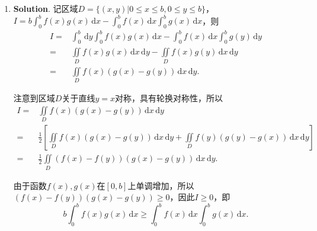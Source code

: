 \documentclass[../Main.tex]{subfiles}
\begin{document}
\begin{enumerate}
    \item[15.] \textbf{Solution}. 记区域$D=\{(x,y)|0\leq x\leq b,0\leq y\leq b\}$，$I
              =b\int_{0}^{b}f(x)g(x)\,\mathrm{d}x-\int_{0}^{b}f(x)\,\mathrm{d}x\int_{0}^{b}g(
              x)\,\mathrm{d}x$，则
          \[
              \begin{aligned}
                  I = & \int_{0}^{b}\,\mathrm{d}y\int_{0}^{b}f(x)g(x)\,\mathrm{d}x - \int_{0}^{b}f(x)\,\mathrm{d}x\int_{0}^{b}g(y)\,\mathrm{d}y \\
                  =   & \iint\limits_{D}f(x)g(x)\,\mathrm{d}x\,\mathrm{d}y - \iint\limits_{D}f(x)g(y)\,\mathrm{d}x\,\mathrm{d}y                 \\
                  =   & \iint\limits_{D}f(x)\left(g(x)-g(y)\right)\,\mathrm{d}x\,\mathrm{d}y.
              \end{aligned}
          \]

          注意到区域$D$关于直线$y=x$对称，具有轮换对称性，所以
          \[
              \begin{aligned}
                  I = & \iint\limits_{D}f(x)\left(g(x)-g(y)\right)\,\mathrm{d}x\,\mathrm{d}y                                                                                                \\
                  =   & \frac{1}{2}\left[\iint\limits_{D}f(x)\left(g(x)-g(y)\right)\,\mathrm{d}x\,\mathrm{d}y + \iint\limits_{D}f(y)\left(g(y)-g(x)\right)\,\mathrm{d}x\,\mathrm{d}y\right] \\
                  =   & \frac{1}{2}\iint\limits_{D}\left(f(x)-f(y)\right)\left(g(x)-g(y)\right)\,\mathrm{d}x\,\mathrm{d}y.
              \end{aligned}
          \]

          由于函数$f(x),g(x)$在$[0,b]$上单调增加，所以$\left(f(x)-f(y)\right)\left(g(
              x)-g(y)\right)\geq 0$，因此$I\geq 0$，即
          \[
              b\int_{0}^{b}f(x)g(x)\,\mathrm{d}x\geq \int_{0}^{b}f(x)\,\mathrm{d}x\int_{0}^{b}
              g(x)\,\mathrm{d}x.
          \]
\end{enumerate}
\end{document}
